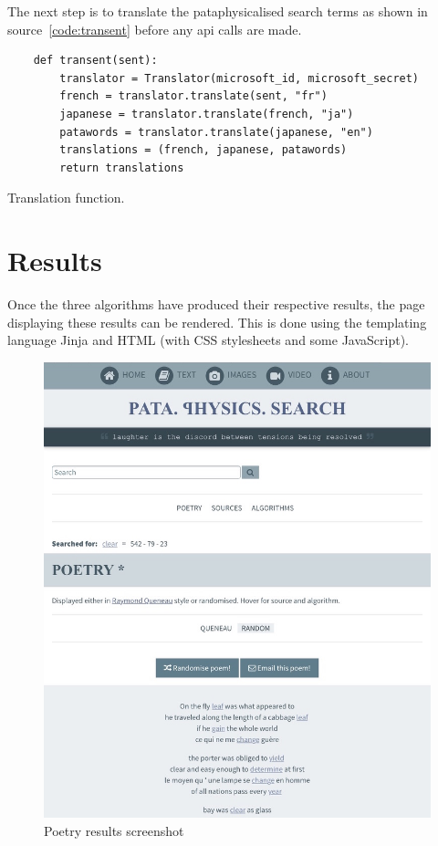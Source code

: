 The next step is to translate the pataphysicalised search terms as shown in source~\ref{code:transent} before any \gls{api} calls are made.

\begin{listing}
  \begin{verbatim}
    def transent(sent):
        translator = Translator(microsoft_id, microsoft_secret)
        french = translator.translate(sent, "fr")
        japanese = translator.translate(french, "ja")
        patawords = translator.translate(japanese, "en")
        translations = (french, japanese, patawords)
        return translations
  \end{verbatim}
\caption{Translation function.}
\label{code:transent}
\end{listing}


\section{Results}

Once the three algorithms have produced their respective results, the page displaying these results can be rendered. This is done using the templating language Jinja and HTML (with CSS stylesheets and some JavaScript).

\begin{figure}[htb] %
  \centering
  \includegraphics[width=\linewidth]{images/screen_rpoetry}
\caption[Poetry results screenshot]{Poetry results screenshot}
\label{img:PoetrySS}
\end{figure}

